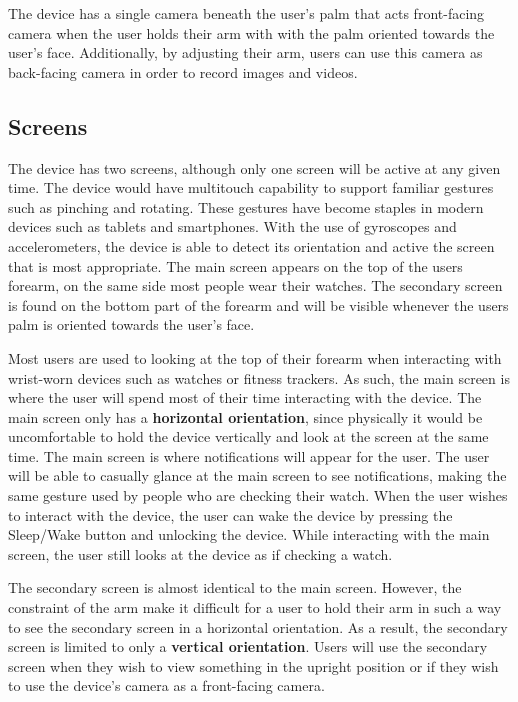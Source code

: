 \documentclass[11pt]{article}
\begin{document}
The device has a single camera beneath the user's palm that acts front-facing camera when the user holds their arm with with the palm oriented towards the user's face. Additionally, by adjusting their arm, users can use this camera as back-facing camera in order to record images and videos. 

\subsection{Screens}

The device has two screens, although only one screen will be active at any given time. The device would have multitouch capability to support familiar gestures such as pinching and rotating. These gestures have become staples in modern devices such as tablets and smartphones. With the use of gyroscopes and accelerometers, the device is able to detect its orientation and active the screen that is most appropriate.  The main screen appears on the top of the users forearm, on the same side most people wear their watches. The secondary screen is found on the bottom part of the forearm and will be visible whenever the users palm is oriented towards the user's face.

Most users are used to looking at the top of their forearm when interacting with wrist-worn devices such as watches or fitness trackers. As such, the main screen is where the user will spend most of their time interacting with the device. The main screen only has a \textbf{horizontal orientation}, since physically it would be uncomfortable to hold the device vertically and look at the screen at the same time. The main screen is where notifications will appear for the user. The user will be able to casually glance at the main screen to see notifications, making the same gesture used by people who are checking their watch. When the user wishes to interact with the device, the user can wake the device by pressing the Sleep/Wake button and unlocking the device. While interacting with the main screen, the user still looks at the device as if checking a watch. 

The secondary screen is almost identical to the main screen. However, the constraint of the arm make it difficult for a user to hold their arm in such a way to see the secondary screen in a horizontal orientation. As a result, the secondary screen is limited to only a \textbf{vertical orientation}. Users will use the secondary screen when they wish to view something in the upright position or if they wish to use the device's camera as a front-facing camera. 
\end{document}
